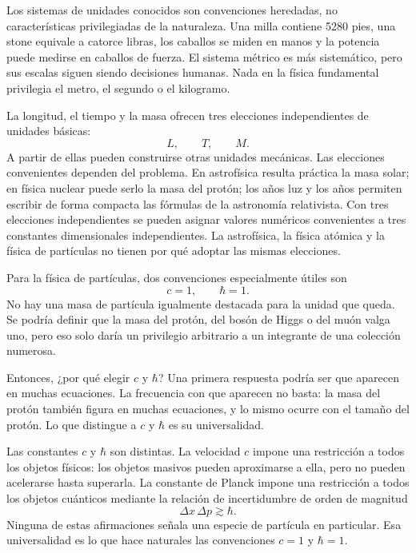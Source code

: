 Los sistemas de unidades conocidos son convenciones heredadas, no características privilegiadas de la naturaleza. Una milla contiene 5280 pies, una stone equivale a catorce libras, los caballos se miden en manos y la potencia puede medirse en caballos de fuerza. El sistema métrico es más sistemático, pero sus escalas siguen siendo decisiones humanas. Nada en la física fundamental privilegia el metro, el segundo o el kilogramo.

La longitud, el tiempo y la masa ofrecen tres elecciones independientes de unidades básicas:
\begin{equation}
L,\qquad T,\qquad M.
\end{equation}
A partir de ellas pueden construirse otras unidades mecánicas. Las elecciones convenientes dependen del problema. En astrofísica resulta práctica la masa solar; en física nuclear puede serlo la masa del protón; los años luz y los años permiten escribir de forma compacta las fórmulas de la astronomía relativista. Con tres elecciones independientes se pueden asignar valores numéricos convenientes a tres constantes dimensionales independientes. La astrofísica, la física atómica y la física de partículas no tienen por qué adoptar las mismas elecciones.

Para la física de partículas, dos convenciones especialmente útiles son
\begin{equation}
c=1,
\qquad
\hbar=1.
\end{equation}
No hay una masa de partícula igualmente destacada para la unidad que queda. Se podría definir que la masa del protón, del bosón de Higgs o del muón valga uno, pero eso solo daría un privilegio arbitrario a un integrante de una colección numerosa.

Entonces, ¿por qué elegir \(c\) y \(\hbar\)? Una primera respuesta podría ser que aparecen en muchas ecuaciones. La frecuencia con que aparecen no basta: la masa del protón también figura en muchas ecuaciones, y lo mismo ocurre con el tamaño del protón. Lo que distingue a \(c\) y \(\hbar\) es su universalidad.

Las constantes \(c\) y \(\hbar\) son distintas. La velocidad \(c\) impone una restricción a todos los objetos físicos: los objetos masivos pueden aproximarse a ella, pero no pueden acelerarse hasta superarla. La constante de Planck impone una restricción a todos los objetos cuánticos mediante la relación de incertidumbre de orden de magnitud
\begin{equation}
\Delta x\,\Delta p\gtrsim\hbar.
\end{equation}
Ninguna de estas afirmaciones señala una especie de partícula en particular. Esa universalidad es lo que hace naturales las convenciones \(c=1\) y \(\hbar=1\).

